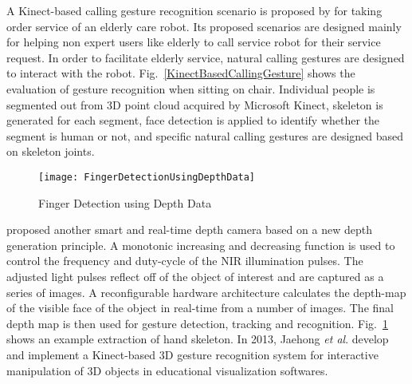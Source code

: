 %
A Kinect-based calling gesture recognition scenario is proposed by \cite{gestureKinect14} for taking order service of an elderly care robot. Its proposed scenarios are designed mainly for helping non expert users like elderly to call service robot for their service request. In order to facilitate elderly service, natural calling gestures are designed to interact with the robot. Fig.~\ref{KinectBasedCallingGesture} shows the evaluation of gesture recognition when sitting on chair. Individual people is segmented out from 3D point cloud acquired by Microsoft Kinect, skeleton is generated for each segment, face detection is applied to identify whether the segment is human or not, and specific natural calling gestures are designed based on skeleton joints. %
%
\begin{figure}[t]
\centering
\texttt{[image: FingerDetectionUsingDepthData]}
\caption{Finger Detection using Depth Data \cite{NIRGesture14}}
\label{FingerDetectionUsingDepthData}
\end{figure}%
%
\cite{NIRGesture14} proposed another smart and real-time depth camera based on a new depth generation principle. A monotonic increasing and decreasing function is used to control the frequency and duty-cycle of the NIR illumination pulses. The adjusted light pulses reflect off of the object of interest and are captured as a series of images. A reconfigurable hardware architecture calculates the depth-map of the visible face of the object in real-time from a number of images. The final depth map is then used for gesture detection, tracking and recognition. Fig.~\ref{FingerDetectionUsingDepthData} shows an example extraction of hand skeleton. In 2013, Jaehong \cite{InteractiveManipulation_2013} \textit{et al}. develop and implement a Kinect-based 3D gesture recognition system for interactive
manipulation of 3D objects in educational visualization softwares. 
\\\indent%
\\\indent
